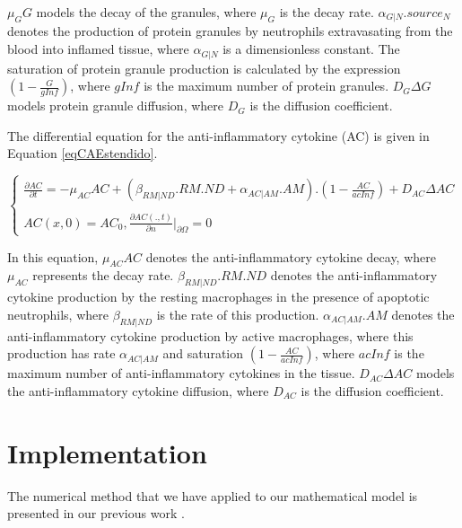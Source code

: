 \documentclass[10pt]{bmc_article}
\newenvironment{bmcformat}{\baselineskip20pt\sloppy\setboolean{publ}{false}}{\baselineskip20pt\sloppy}
\begin{document}
\begin{bmcformat}
$\mu_G G$ models the decay of the granules, where $\mu_G$ is the decay rate. $\alpha _{G|N}.source_{N}$ denotes the production of 
protein granules by neutrophils extravasating from the blood into inflamed tissue, where $\alpha_{G|N}$ is a dimensionless constant. 
The saturation of protein granule production is calculated by the expression $(1 - \frac{G}{gInf})$, where $gInf$ is the maximum number 
of protein granules. $D_{G} \Delta G$ models protein granule diffusion, where $D_{G}$ is the diffusion coefficient.

The differential equation for the anti-inflammatory cytokine (AC) is given in Equation \ref{eqCAEstendido}.

\begin{equation}
\label{eqCAEstendido}
\begin{cases} 
\frac{\partial AC}{\partial t} = -\mu_{AC} AC + (\beta_{RM|ND}.RM.ND + \alpha_{AC|AM}.AM).(1 - \frac{AC}{acInf}) + D_{AC} \Delta AC \\\\
AC(x,0) =  AC_0, \frac{\partial AC(.,t)}{\partial n} |_{\partial\Omega} = 0 
\end{cases}
\end{equation}

In this equation, $\mu_{AC} AC$ denotes the anti-inflammatory cytokine decay, where $\mu_{AC}$ represents the decay rate. 
$\beta _{RM|ND}.RM.ND$ denotes the anti-inflammatory cytokine production by the resting macrophages in the presence of apoptotic 
neutrophils, where $\beta _{RM|ND}$ is the rate of this production. 
$\alpha _{AC|AM}.AM$ denotes the anti-inflammatory cytokine production by active macrophages, where this production has 
rate $\alpha _{AC|AM}$ and saturation $(1 - \frac{AC}{acInf})$, where $acInf$ is the maximum number of anti-inflammatory cytokines 
in the tissue. $D_{AC} \Delta AC$ models the anti-inflammatory cytokine diffusion, where $D_{AC}$ is the diffusion coefficient.


\section*{Implementation}\label{implementation}

The numerical method that we have applied to our mathematical model is presented in our previous work \cite{icaris11}.

% 
% 


\end{bmcformat}
\end{document}
